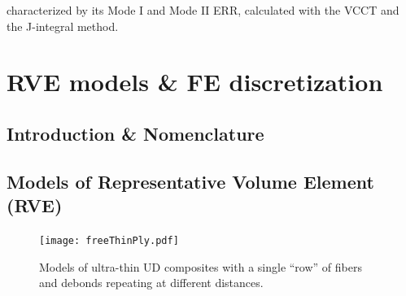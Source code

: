 \documentclass[review]{elsarticle}
\begin{document}
characterized by its Mode I and Mode II ERR, calculated with the VCCT and the J-integral method.


\section{RVE models \& FE discretization}


\subsection{Introduction \& Nomenclature}\label{subsec:names}

\subsection{Models of Representative Volume Element (RVE)}\label{subsec:rve}

\begin{figure}[!h]
\centering
  \texttt{[image: freeThinPly.pdf]}
\caption{Models of ultra-thin UD composites with a single ``row'' of fibers and debonds repeating at different distances.}\label{fig:laminateModelsA}
\end{figure}
\end{document}

